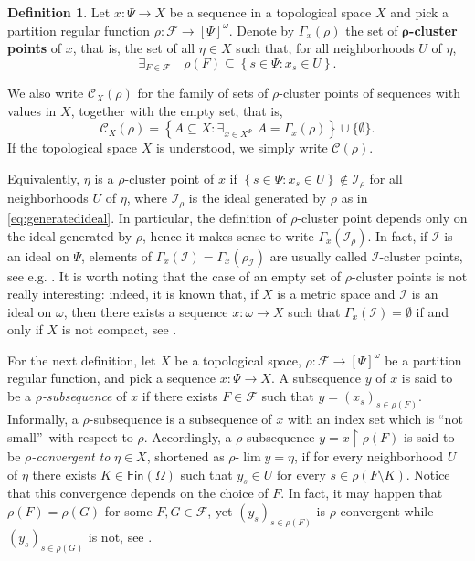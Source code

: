\documentclass{amsart}
\theoremstyle{plain}
\theoremstyle{definition}
\newtheorem{defi}[thm]{Definition}
\theoremstyle{remark}
\newcommand{\cI}{\mathcal{I}}
\newcommand{\I}{\cI}
\newcommand{\FIN}{\mathsf{Fin}} \newcommand{\fin}{\FIN}
\newcommand{\Fin}{\FIN}
\begin{document}
\begin{defi}\label{defi:rhoclusterpoint}
Let $x: \Psi\to X$ be a sequence in a topological space $X$ 
and pick a partition regular function $\rho: \mathcal{F}\to [\Psi]^\omega$. 
Denote by $\Gamma_x(\rho)$ the set of $\bm{\rho}$\textbf{-cluster points} of $x$, that is, the set of all $\eta \in X$ such that, for all neighborhoods $U$ of $\eta$, 
\begin{equation*}
    \exists_{F \in \mathcal{F}} \quad 
    \rho(F)\subseteq \left\{s \in \Psi: x_s \in U\right\}. 
\end{equation*}

    We also write $\mathscr{C}_X(\rho)$ for the family of sets of $\rho$-cluster points of sequences with values in $X$, together with the empty set, that is, 
\begin{equation*}
    \mathscr{C}_X(\rho)=\left\{A\subseteq X: \exists_{x \in X^\Psi}\,\,A=\Gamma_x(\rho)\right\}\cup \{\emptyset\}. 
\end{equation*}
    If the topological space $X$ is understood, we simply write $\mathscr{C}(\rho)$.
\end{defi}
Equivalently, $\eta$ is a $\rho$-cluster point of $x$ if $\left\{s \in \Psi: x_s \in U\right\}\notin \mathcal{I}_\rho$ for all neighborhoods $U$ of $\eta$, where $\I_\rho$ is the ideal generated by $\rho$ as in \eqref{eq:generatedideal}. In particular, the definition of $\rho$-cluster point depends only on the ideal generated by $\rho$, hence it makes sense to write $\Gamma_x(\I_\rho)$. In fact, if $\I$ is an ideal on $\Psi$, elements of $\Gamma_x(\I)=\Gamma_x(\rho_\I)$ are usually called $\I$-cluster points, see e.g. \cite{MR3883171, MR3920799}. It is worth noting that the case of an empty set of $\rho$-cluster points is not really interesting: indeed, it is known that, if $X$ is a metric space and $\I$ is an ideal on $\omega$, then there exists a sequence $x: \omega\to X$ such that $\Gamma_x(\I)=\emptyset$ if and only if $X$ is not compact, see \cite[Proposition 5.1]{FKL24}. 


For the next definition, let $X$ be a topological space, $\rho: \mathcal{F}\to [\Psi]^\omega$ be a partition regular function, and pick a sequence $x: \Psi\to X$. A subsequence $y$ of $x$ is said to be a $\rho$\emph{-subsequence} of $x$ if there exists $F \in \mathcal{F}$ such that $y=(x_s)_{s \in \rho(F)}$. Informally, a $\rho$-subsequence is a subsequence of $x$ with an index set which is \textquotedblleft not small\textquotedblright\, with respect to $\rho$. Accordingly, a $\rho$-subsequence $y=x\upharpoonright \rho(F)$ is said to be $\rho$\emph{-convergent to} $\eta \in X$, shortened as $\rho\text{-}\lim y=\eta$, if for every neighborhood $U$ of $\eta$ there exists $K \in \Fin(\Omega)$ such that 
$y_s \in U$ for every $s \in \rho(F\setminus K)$. 
Notice that this convergence depends on the choice of $F$. In fact, it may happen that $\rho(F)=\rho(G)$ for some $F,G \in \mathcal{F}$, yet $(y_s)_{s \in \rho(F)}$ is $\rho$-convergent while $(y_s)_{s \in \rho(G)}$ is not, see \cite{FKK23}. 
\end{document}
